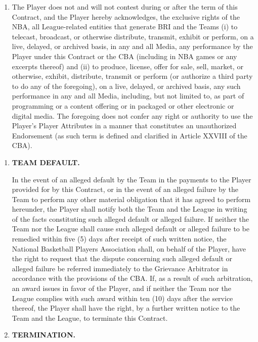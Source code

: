 \documentclass[
]{book}
\begin{document}
\begin{enumerate}
\item
  The Player does not and will not contest during or after the term of this Contract, and the Player hereby acknowledges, the exclusive rights of the NBA, all League-related entities that generate BRI and the Teams (i) to telecast, broadcast, or otherwise distribute, transmit, exhibit or perform, on a live, delayed, or archived basis, in any and all Media, any performance by the Player under this Contract or the CBA (including in NBA games or any excerpts thereof) and (ii) to produce, license, offer for sale, sell, market, or otherwise, exhibit, distribute, transmit or perform (or authorize a third party to do any of the foregoing), on a live, delayed, or archived basis, any such performance in any and all Media, including, but not limited to, as part of programming or a content offering or in packaged or other electronic or digital media. The foregoing does not confer any right or authority to use the Player's Player Attributes in a manner that constitutes an unauthorized Endorsement (as such term is defined and clarified in Article XXVIII of the CBA).
\end{enumerate}

\begin{enumerate}
\def\labelenumi{\arabic{enumi}.}
\setcounter{enumi}{14}
\item
  \textbf{TEAM DEFAULT.}

  In the event of an alleged default by the Team in the payments to the Player provided for by this Contract, or in the event of an alleged failure by the Team to perform any other material obligation that it has agreed to perform hereunder, the Player shall notify both the Team and the League in writing of the facts constituting such alleged default or alleged failure. If neither the Team nor the League shall cause such alleged default or alleged failure to be remedied within five (5) days after receipt of such written notice, the National Basketball Players Association shall, on behalf of the Player, have the right to request that the dispute concerning such alleged default or alleged failure be referred immediately to the Grievance Arbitrator in accordance with the provisions of the CBA. If, as a result of such arbitration, an award issues in favor of the Player, and if neither the Team nor the League complies with such award within ten (10) days after the service thereof, the Player shall have the right, by a further written notice to the Team and the League, to terminate this Contract.
\item
  \textbf{TERMINATION.}
\end{enumerate}
\end{document}
